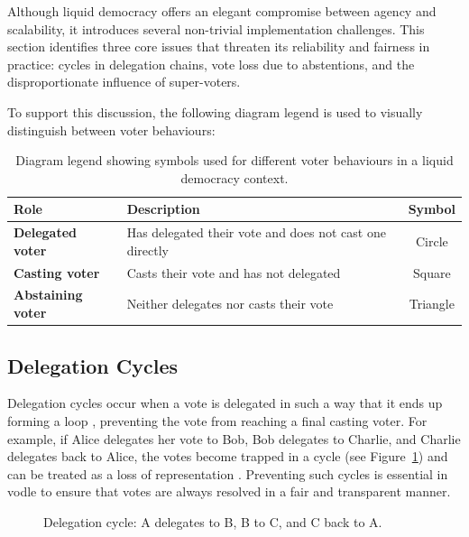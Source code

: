 Although liquid democracy offers an elegant compromise between agency and scalability, it introduces several non-trivial implementation challenges. This section identifies three core issues that threaten its reliability and fairness in practice: cycles in delegation chains, vote loss due to abstentions, and the disproportionate influence of super-voters.

To support this discussion, the following diagram legend is used to visually distinguish between voter behaviours:

\begin{table}[H]
  \centering
  \begin{tabular}{|l|l|c|}
  \hline
  \textbf{Role} & \textbf{Description} & \textbf{Symbol}\\ \hline
  \textbf{Delegated voter} & Has delegated their vote and does not cast one directly & Circle \\
  \textbf{Casting voter} & Casts their vote and has not delegated & Square \\
  \textbf{Abstaining voter} & Neither delegates nor casts their vote & Triangle \\
  \hline
  \end{tabular}
  \caption{Diagram legend showing symbols used for different voter behaviours in a liquid democracy context.}
\end{table}  

\subsection*{Delegation Cycles}\label{subsec:delegation_cycles}
Delegation cycles occur when a vote is delegated in such a way that it ends up forming a loop \citep{brill_liquid_2022}, preventing the vote from reaching a final casting voter. For example, if Alice delegates her vote to Bob, Bob delegates to Charlie, and Charlie delegates back to Alice, the votes become trapped in a cycle (see Figure~\ref{fig:triangle-cycle}) and can be treated as a loss of representation \citep{christoff2017liquiddemocracyanalysisbinary}. Preventing such cycles is essential in vodle to ensure that votes are always resolved in a fair and transparent manner.

\begin{figure}[H]
  \centering
  \caption{Delegation cycle: A delegates to B, B to C, and C back to A.}
  \label{fig:triangle-cycle}
\end{figure}

